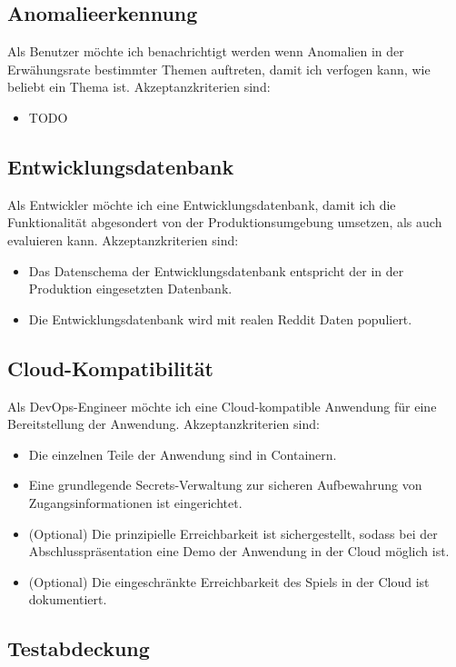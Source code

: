 \documentclass[a4paper, 10pt, conference]{ieeeconf}
\begin{document}
\subsection{Anomalieerkennung}

Als Benutzer möchte ich benachrichtigt werden wenn Anomalien in der Erwähungsrate bestimmter Themen auftreten,  damit ich verfogen kann, wie beliebt ein Thema ist.  Akzeptanzkriterien sind:
\begin{itemize}
\item TODO
\end{itemize}

\subsection{Entwicklungsdatenbank}

Als Entwickler möchte ich eine Entwicklungsdatenbank, damit ich die Funktionalität abgesondert von der Produktionsumgebung umsetzen, als auch evaluieren kann.  Akzeptanzkriterien sind:
\begin{itemize}
\item Das Datenschema der Entwicklungsdatenbank entspricht der in der Produktion eingesetzten Datenbank.
\item Die Entwicklungsdatenbank wird mit realen Reddit Daten populiert.
\end{itemize}

\subsection{Cloud-Kompatibilität}

Als DevOps-Engineer möchte ich eine Cloud-kompatible Anwendung für eine Bereitstellung der Anwendung.  Akzeptanzkriterien sind:
\begin{itemize}
\item Die einzelnen Teile der Anwendung sind in Containern.
\item Eine grundlegende Secrets-Verwaltung zur sicheren Aufbewahrung von Zugangsinformationen ist eingerichtet.
\item (Optional) Die prinzipielle Erreichbarkeit ist sichergestellt,  sodass bei der Abschlusspräsentation eine Demo der Anwendung in der Cloud möglich ist.
\item (Optional) Die eingeschränkte Erreichbarkeit des Spiels in der Cloud ist dokumentiert.
\end{itemize}

\subsection{Testabdeckung}
\end{document}
